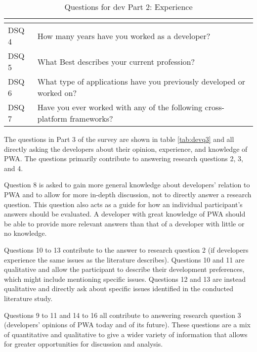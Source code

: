 \documentclass[a4paper,12pt]{article}
\begin{document}
\begin{table}[h]
\centering
{}
\begin{tabular}{|l|p{11cm}|}
\hline
\rowcolor[HTML]{656565} 
\multicolumn{1}{|c|}{\cellcolor[HTML]{656565}{\color[HTML]{FFFFFF} Number}} & \multicolumn{1}{l|}{\cellcolor[HTML]{656565}{\color[HTML]{FFFFFF} Question}} \\ \hline
DSQ 4 & How many years have you worked as a developer? \\
DSQ 5 & What Best describes your current profession? \\
DSQ 6 & What type of applications have you previously developed or worked on? \\
DSQ 7 & Have you ever worked with any of the following cross-platform frameworks? \\
\hline
\end{tabular}
\caption{Questions for dev Part 2: Experience}
\label{tab:devq2}
\end{table}

The questions in Part 3 of the survey are shown in table \ref{tab:devq3} and all directly asking the developers about their opinion, experience, and knowledge of PWA. The questions primarily contribute to answering research questions 2, 3, and 4.  

Question 8 is asked to gain more general knowledge about developers’ relation to PWA and to allow for more in-depth discussion, not to directly answer a research question.  This question also acts as a guide for how an individual participant’s answers should be evaluated. A developer with great knowledge of PWA should be able to provide more relevant answers than that of a developer with little or no knowledge.

Questions 10 to 13 contribute to the answer to research question 2 (if developers experience the same issues as the literature describes). Questions 10 and 11 are qualitative and allow the participant to describe their development preferences, which might include mentioning specific issues. Questions 12 and 13 are instead qualitative and directly ask about specific issues identified in the conducted literature study.

Questions 9 to 11 and 14 to 16 all contribute to answering research question 3 (developers’ opinions of PWA today and of its future). These questions are a mix of quantitative and qualitative to give a wider variety of information that allows for greater opportunities for discussion and analysis. 
\end{document}
